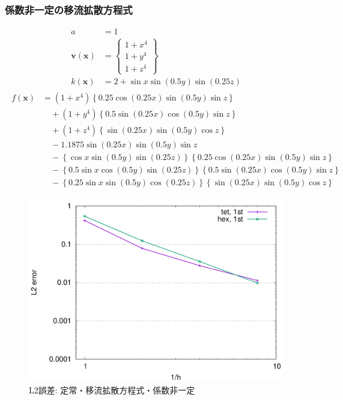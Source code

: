 \documentclass[8pt,a4paper]{article}
\newcommand{\bsm}{\boldsymbol}
\begin{document}
\subsubsection{係数非一定の移流拡散方程式}
 \label{sec:gen}
\begin{align}
	a &= 1 \\
	\bsm{v} (\bsm{x}) &= 
	\begin{Bmatrix}
		1 + x^4 \\
		1 + y^4 \\
		1 + z^4
	\end{Bmatrix} \\
	k (\bsm{x}) &= 2 + \sin x \sin \left( 0.5 y \right) \sin \left( 0.25 z \right)
\end{align}
\begin{align}
	\begin{split}
	f (\bsm{x}) &= \left( 1 + x^4 \right) \left\{ 0.25 \cos \left( 0.25 x \right) \sin \left( 0.5 y \right) \sin z \right\} \\
		& \quad + \left( 1 + y^4 \right) \left\{ 0.5  \sin \left( 0.25 x \right) \cos \left( 0.5 y \right) \sin z \right\} \\
		& \quad + \left( 1 + z^4 \right) \left\{      \sin \left( 0.25 x \right) \sin \left( 0.5 y \right) \cos z \right\} \\
		& \quad - 1.1875 \sin \left( 0.25 x \right) \sin \left( 0.5 y \right) \sin z \\
		& \quad - \left\{     \cos x \sin \left( 0.5 y \right) \sin \left( 0.25 z \right) \right\} \left\{ 0.25 \cos \left( 0.25 x \right) \sin \left( 0.5 y \right) \sin z \right\} \\
		& \quad - \left\{0.5  \sin x \cos \left( 0.5 y \right) \sin \left( 0.25 z \right) \right\} \left\{ 0.5  \sin \left( 0.25 x \right) \cos \left( 0.5 y \right) \sin z \right\} \\
		& \quad - \left\{0.25 \sin x \sin \left( 0.5 y \right) \cos \left( 0.25 z \right) \right\} \left\{      \sin \left( 0.25 x \right) \sin \left( 0.5 y \right) \cos z \right\} 
	\end{split}
\end{align}
\begin{figure}[h!!]
	\centering
	\includegraphics[width=10.0truecm]{pics/conv_convdiff_nonconst.pdf}
	\caption{L2誤差: 定常・移流拡散方程式・係数非一定}
	\label{fig:conv_convdiff_nonconst}
\end{figure}
\end{document}
